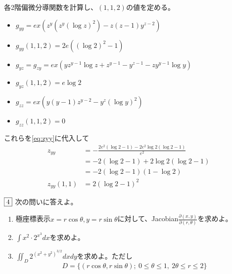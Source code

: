 \documentclass[dvipdfmx]{jsreport}
\newcounter{num}[section]
\begin{document}
\begin{answer}
\begin{enumerate}
\begin{enumerate_roman}
	各2階偏微分導関数を計算し、$(1, 1, 2)$の値を定める。
\begin{itemize}
	\item $g_{yy}= ex(z^y(z^y(\log{z})^2)- z(z- 1)y^{z- 2})$
	\item[$\Rightarrow$] $g_{yy}(1, 1, 2)= 2e((\log{2})^2- 1)$ 
	\item $g_{yz}= g_{zy}= ex(yz^{y- 1}\log{z}+ z^{y- 1}- y^{z- 1}- zy^{y- 1}\log{y})$
	\item[$\Rightarrow$] $g_{yz}(1, 1, 2)= e\log{2}$
	\item $g_{zz}= ex(y(y- 1)z^{y- 2}- y^z(\log{y})^2)$
	\item[$\Rightarrow$] $g_{zz}(1, 1, 2)= 0$
\end{itemize}
	これらを\eqref{eq:zyy}に代入して
\begin{align*}
	z_{yy}
	&= -\frac{2e^2(\log{2}- 1)- 2e^2\log{2}(\log{2}- 1)}{e^2}\\
	&= -2(\log{2}- 1)+ 2\log{2}(\log{2}- 1)\\
	&= -2(\log{2}- 1)(1- \log{2})\\
	z_{yy}(1, 1)
	&= 2(\log{2}- 1)^2
\end{align*}



\end{enumerate_roman}
\end{enumerate}
\end{answer}

\begin{tcolorbox} %
	$\fbox{4}$ 次の問いに答えよ。
\begin{enumerate}
	\item 極座標表示$x= r\cos{\theta}, y= r\sin{\theta}$に対して、Jacobian$\frac{\partial(x, y)}{\partial(r, \theta)}$を求めよ。
	\item $\int x^2\cdot 2^{x^3} dx$を求めよ。
	\item $\iint_{D} 2^{(x^2+ y^2)^{3/2}} dxdy$を求めよ。ただし
\begin{equation*}
	D= \{(r\cos{\theta}, r\sin{\theta});\ 0\le \theta\le 1,\ 2\theta\le r\le 2\}
\end{equation*}
\end{enumerate}
\end{tcolorbox}
\end{document}
